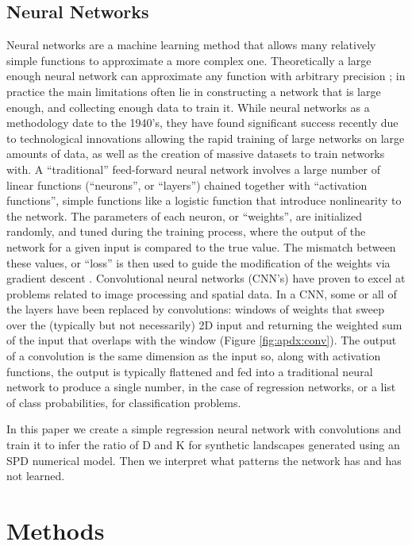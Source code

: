 \documentclass[draft]{agujournal2019}
\begin{document}
\subsection{Neural Networks}
\label{sec:orgba1338a}
Neural networks are a machine learning method that allows many relatively simple functions to approximate a more complex one.  Theoretically a large enough neural network can approximate any function with arbitrary precision \cite{cybenkoApproximationSuperpositionsSigmoidal1989}; in practice the main limitations often lie in constructing a network that is large enough, and collecting enough data to train it.  While neural networks as a methodology date to the 1940's, they have found significant success recently due to technological innovations allowing the rapid training of large networks on large amounts of data, as well as the creation of massive datasets to train networks with.  A ``traditional'' feed-forward neural network involves a large number of linear functions (``neurons'', or ``layers'') chained together with ``activation functions'', simple functions like a logistic function that introduce nonlinearity to the network.  The parameters of each neuron, or ``weights'', are initialized randomly, and tuned during the training process, where the output of the network for a given input is compared to the true value.  The mismatch between these values, or ``loss'' is then used to guide the modification of the weights via gradient descent \cite{princeUnderstandingDeepLearning2023}.
Convolutional neural networks (CNN's) have proven to excel at problems related to image processing and spatial data.  In a CNN, some or all of the layers have been replaced by convolutions:  windows of weights that sweep over the (typically but not necessarily) 2D input and returning the weighted sum of the input that overlaps with the window (Figure \ref{fig:apdx:conv}).  The output of a convolution is the same dimension as the input so, along with activation functions, the output is typically flattened and fed into a traditional neural network to produce a single number, in the case of regression networks, or a list of class probabilities, for classification problems.

In this paper we create a simple regression neural network with convolutions and train it to infer the ratio of D and K for synthetic landscapes generated using an SPD numerical model.  Then we interpret what patterns the network has and has not learned.
\section{Methods}
\label{sec:org7161f3a}
\end{document}
